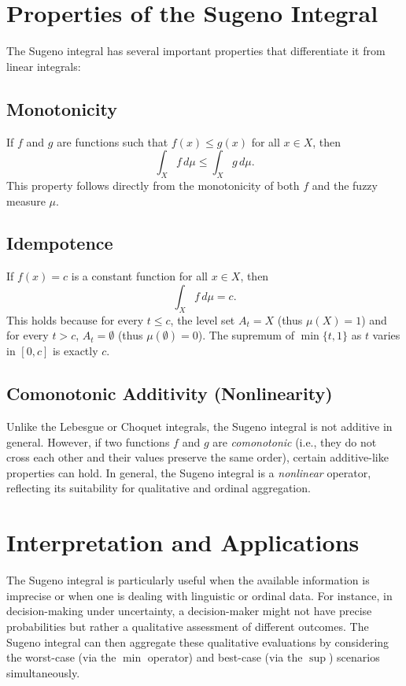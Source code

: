 \documentclass[12pt]{article}
\begin{document}
\section{Properties of the Sugeno Integral}

The Sugeno integral has several important properties that differentiate it from linear integrals:

\subsection{Monotonicity}
If \(f\) and \(g\) are functions such that \(f(x) \leq g(x)\) for all \(x \in X\), then
\[
\int_X f \,d\mu \leq \int_X g \,d\mu.
\]
This property follows directly from the monotonicity of both \(f\) and the fuzzy measure \(\mu\).

\subsection{Idempotence}
If \(f(x) = c\) is a constant function for all \(x \in X\), then
\[
\int_X f \,d\mu = c.
\]
This holds because for every \(t \leq c\), the level set \(A_t = X\) (thus \(\mu(X) = 1\)) and for every \(t > c\), \(A_t = \emptyset\) (thus \(\mu(\emptyset) = 0\)). The supremum of \(\min\{t,1\}\) as \(t\) varies in \([0, c]\) is exactly \(c\).

\subsection{Comonotonic Additivity (Nonlinearity)}
Unlike the Lebesgue or Choquet integrals, the Sugeno integral is not additive in general. However, if two functions \(f\) and \(g\) are \emph{comonotonic} (i.e., they do not cross each other and their values preserve the same order), certain additive-like properties can hold. In general, the Sugeno integral is a \emph{nonlinear} operator, reflecting its suitability for qualitative and ordinal aggregation.

\section{Interpretation and Applications}

The Sugeno integral is particularly useful when the available information is imprecise or when one is dealing with linguistic or ordinal data. For instance, in decision-making under uncertainty, a decision-maker might not have precise probabilities but rather a qualitative assessment of different outcomes. The Sugeno integral can then aggregate these qualitative evaluations by considering the worst-case (via the \(\min\) operator) and best-case (via the \(\sup\)) scenarios simultaneously.
\end{document}
